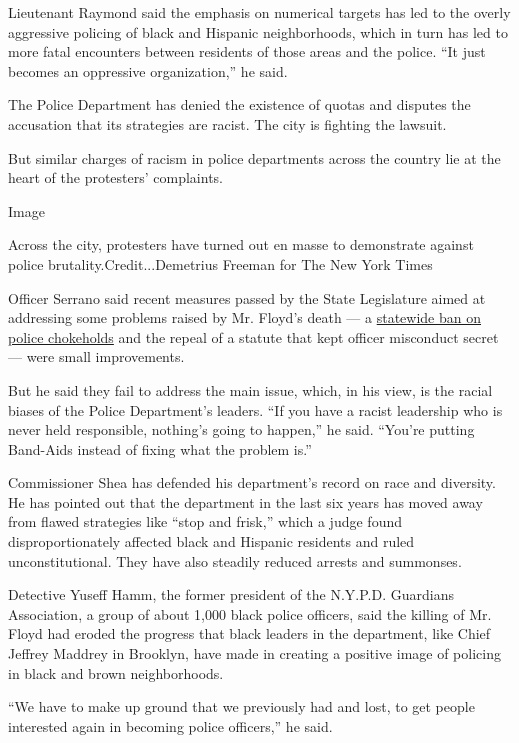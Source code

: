 Lieutenant Raymond said the emphasis on numerical targets has led to the
overly aggressive policing of black and Hispanic neighborhoods, which in
turn has led to more fatal encounters between residents of those areas
and the police. ``It just becomes an oppressive organization,'' he said.

The Police Department has denied the existence of quotas and disputes
the accusation that its strategies are racist. The city is fighting the
lawsuit.

But similar charges of racism in police departments across the country
lie at the heart of the protesters' complaints.

Image

Across the city, protesters have turned out en masse to demonstrate
against police brutality.Credit...Demetrius Freeman for The New York
Times

Officer Serrano said recent measures passed by the State Legislature
aimed at addressing some problems raised by Mr. Floyd's death --- a
\href{https://www.nytimes3xbfgragh.onion/2020/06/12/nyregion/50a-repeal-police-floyd.html?searchResultPosition=20}{statewide
ban on police chokeholds} and the repeal of a statute that kept officer
misconduct secret --- were small improvements.

But he said they fail to address the main issue, which, in his view, is
the racial biases of the Police Department's leaders. ``If you have a
racist leadership who is never held responsible, nothing's going to
happen,'' he said. ``You're putting Band-Aids instead of fixing what the
problem is.''

Commissioner Shea has defended his department's record on race and
diversity. He has pointed out that the department in the last six years
has moved away from flawed strategies like ``stop and frisk,'' which a
judge found disproportionately affected black and Hispanic residents and
ruled unconstitutional. They have also steadily reduced arrests and
summonses.

Detective Yuseff Hamm, the former president of the N.Y.P.D. Guardians
Association, a group of about 1,000 black police officers, said the
killing of Mr. Floyd had eroded the progress that black leaders in the
department, like Chief Jeffrey Maddrey in Brooklyn, have made in
creating a positive image of policing in black and brown neighborhoods.

``We have to make up ground that we previously had and lost, to get
people interested again in becoming police officers,'' he said.

